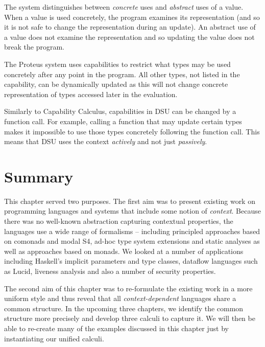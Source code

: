The system distinguishes between \emph{concrete} uses and \emph{abstract} uses of a value. When
a value is used concretely, the program examines its representation (and so it is not safe to
change the representation during an update). An abstract use of a value does not examine
the representation and so updating the value does not break the program.

The Proteus system uses capabilities to restrict what types may be used concretely after any point
in the program. All other types, not listed in the capability, can be dynamically updated as this
will not change concrete representation of types accessed later in the evaluation.

Similarly to Capability Calculus, capabilities in DSU can be changed by a function call. For
example, calling a function that may update certain types makes it impossible to use those types
concretely following the function call. This means that DSU uses the context \emph{actively}
and not just \emph{passively}.


%
%

\section{Summary}

This chapter served two purposes. The first aim was to present existing work on programming
languages and systems that include some notion of \emph{context}. Because there was no well-known
abstraction capturing contextual properties, the languages use a wide range of formalisms -- including
principled approaches based on comonads and modal S4, ad-hoc type system extensions and static analyses
as well as approaches based on monads. We looked at a number of applications including Haskell's implicit
parameters and type classes, dataflow languages such as Lucid, liveness analysis and also a number of
security properties.

The second aim of this chapter was to re-formulate the existing work in a more uniform style and thus
reveal that all \emph{context-dependent} languages share a common structure. In the upcoming three
chapters, we identify the common structure more precisely and develop three calculi to capture it. We
will then be able to re-create many of the examples discussed in this chapter just by instantiating our
unified calculi.

